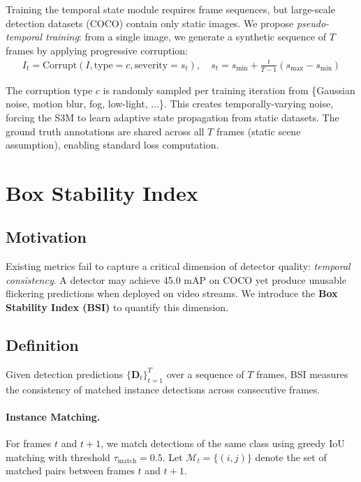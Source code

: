 \documentclass[review]{eccv2026}
\begin{document}
Training the temporal state module requires frame sequences, but large-scale detection datasets (COCO) contain only static images.
We propose \textit{pseudo-temporal training}: from a single image, we generate a synthetic sequence of $T$ frames by applying progressive corruption:
\begin{align}
  I_t = \text{Corrupt}(I, \text{type}=c, \text{severity}=s_t), \quad s_t = s_\text{min} + \frac{t}{T-1}(s_\text{max} - s_\text{min}) \label{eq:pseudo}
\end{align}

The corruption type $c$ is randomly sampled per training iteration from \{Gaussian noise, motion blur, fog, low-light, ...\}.
This creates temporally-varying noise, forcing the S3M to learn adaptive state propagation from static datasets.
The ground truth annotations are shared across all $T$ frames (static scene assumption), enabling standard loss computation.

\section{Box Stability Index}
\label{sec:bsi}

\subsection{Motivation}

Existing metrics fail to capture a critical dimension of detector quality: \textit{temporal consistency}.
A detector may achieve 45.0 mAP on COCO yet produce unusable flickering predictions when deployed on video streams.
We introduce the \textbf{Box Stability Index (BSI)} to quantify this dimension.

\subsection{Definition}

Given detection predictions $\{\bm{D}_t\}_{t=1}^{T}$ over a sequence of $T$ frames, BSI measures the consistency of matched instance detections across consecutive frames.

\paragraph{Instance Matching.}
For frames $t$ and $t+1$, we match detections of the same class using greedy IoU matching with threshold $\tau_\text{match} = 0.5$.
Let $\mathcal{M}_t = \{(i, j)\}$ denote the set of matched pairs between frames $t$ and $t+1$.
\end{document}

